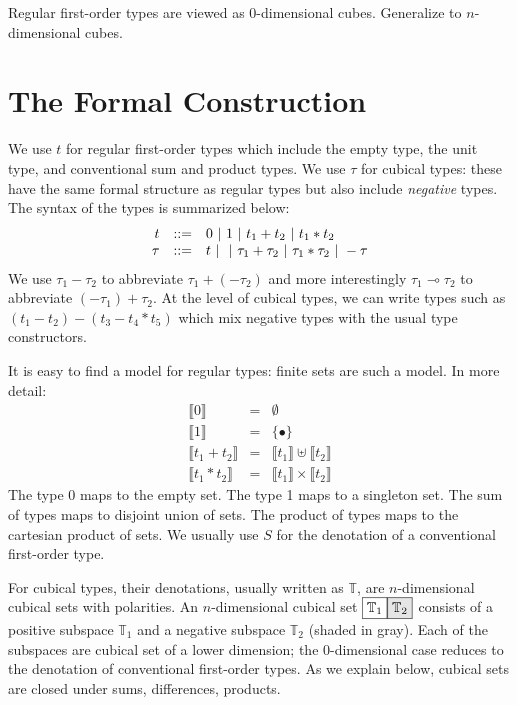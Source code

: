 \documentclass[authoryear,preprint]{sigplanconf}
\newcommand{\lolli}{\multimap}
\newcommand{\cubt}{\mathbb{T}}
\newcommand{\den}[1]{\llbracket #1 \rrbracket}
\newcommand{\nodet}[2]{\fcolorbox{black}{white}{$#1$}\fcolorbox{black}{gray!20}{$#2$}}
\begin{document}
Regular first-order types are viewed as 0-dimensional cubes. Generalize to
$n$-dimensional cubes. 

\section{The Formal Construction} 

We use $t$ for regular first-order types which include the empty type, the
unit type, and conventional sum and product types.  We use $\tau$ for cubical
types: these have the same formal structure as regular types but also include
\emph{negative} types. The syntax of the types is summarized below:
\[\begin{array}{rcl}
t &::=& 0 ~|~ 1 ~|~ t_1 + t_2 ~|~ t_1 * t_2 \\
\tau &::=& t ~|~ 
      ~|~ \tau_1 + \tau_2
      ~|~ \tau_1 * \tau_2
      ~|~ - \tau
\end{array}\]
We use $\tau_1 - \tau_2$ to abbreviate $\tau_1 + (- \tau_2)$ and more
interestingly $\tau_1 \lolli \tau_2$ to abbreviate $(- \tau_1) + \tau_2$. At
the level of cubical types, we can write types such as
$(t_1-t_2)-(t_3-t_4*t_5)$ which mix negative types with the usual type
constructors.

It is easy to find a model for regular types: finite sets are such a
model. In more detail:
\[\begin{array}{rcl}
\den{0} &=& \emptyset \\
\den{1} &=& \{ \bullet \} \\
\den{t_1 + t_2} &=& \den{t_1} \uplus \den{t_2} \\
\den{t_1 * t_2} &=& \den{t_1} \times \den{t_2} 
\end{array}\]
The type 0 maps to the empty set. The type 1 maps to a singleton set. The sum
of types maps to disjoint union of sets. The product of types maps to the
cartesian product of sets. We usually use $S$ for the denotation of a
conventional first-order type.

For cubical types, their denotations, usually written as $\cubt$, are
$n$-dimensional cubical sets with polarities. An $n$-dimensional cubical set
$\nodet{\cubt_1}{\cubt_2}$ consists of a positive subspace $\cubt_1$ and a
negative subspace $\cubt_2$ (shaded in gray). Each of the subspaces are
cubical set of a lower dimension; the 0-dimensional case reduces to the
denotation of conventional first-order types. As we explain below, cubical
sets are closed under sums, differences, products.
\end{document}

